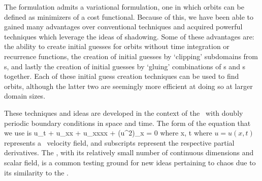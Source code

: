 The {\spt} formulation admits a variational formulation, one in which orbits can be
defined as minimizers of a cost functional. Because of this, we have been able to
gained many advantages over conventional techniques and acquired powerful techniques
which leverage the ideas of shadowing.
Some of these advantages are: the ability to create initial guesses for orbits
without time integration or recurrence functions, 
the creation of initial guesses by `clipping' subdomains from {\po}s,
and lastly the creation of initial guesses by
`gluing' {\spt} combinations of {\po}s and {\fpo}s together. Each of these
initial guess creation techniques can be used to find orbits, although the
latter two are seemingly more efficient at doing so at larger {\spt} domain sizes. 

These techniques and ideas are developed in the context of the {\spt} \KSe\ with doubly periodic
boundary conditions in space and time.
The form of the equation that we use is
\beq \label{e-ks}
u_t + u_{xx} + u_{xxxx} + (u^2)_x = 0 \quad \mbox{where} \quad x\in[0,\speriod{}], t\in[0,\period{}]
\eeq
where $u = u(x, t)$ represents a \spt\ velocity field, and subscripts
represent the respective partial derivatives.
The {\KSe}, with its relatively small number of continuous dimensions and scalar field,
is a common testing ground for new ideas pertaining to {\spt} chaos due to its
similarity to the \NSe. 

